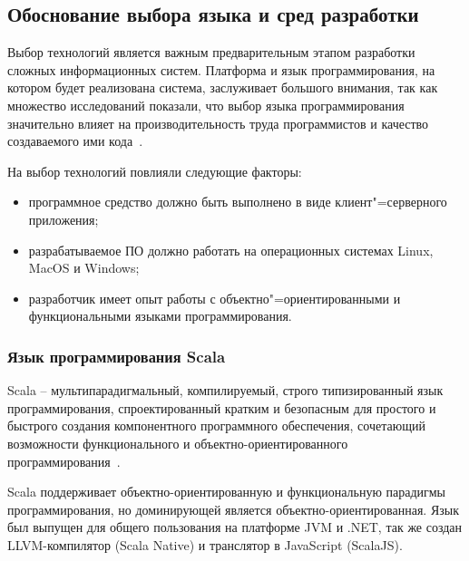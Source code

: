 \subsection{Обоснование выбора языка и сред разработки}
\label{sec:techs:intro}

Выбор технологий является важным предварительным этапом разработки сложных информационных систем. Платформа и язык программирования, на котором будет реализована система, заслуживает большого внимания, так как множество исследований показали, что выбор языка программирования значительно влияет на производительность труда программистов и качество создаваемого ими кода~\cite[c.~59]{mcconnell_2005}.

На выбор технологий повлияли следующие факторы:
\begin{itemize}
\item программное средство должно быть выполнено в виде клиент"=серверного приложения;
\item разрабатываемое ПО должно работать на операционных системах Linux, MacOS и Windows;
\item разработчик имеет опыт работы с объектно"=ориентированными и функциональными языками программирования.
\end{itemize}

\subsubsection{Язык программирования Scala}
\label{sub:techs:scala}
Scala – мультипарадигмальный, компилируемый, строго типизированный язык программирования, спроектированный кратким и безопасным для простого и быстрого создания компонентного программного обеспечения, сочетающий возможности функционального и объектно-ориентированного программирования~\cite{wiki_scala}.

Scala поддерживает объектно-ориентированную и функциональную парадигмы программирования, но доминирующей является объектно-ориентированная. Язык был выпущен для общего пользования на платформе JVM и .NET, так же создан LLVM-компилятор (Scala Native) и транслятор в JavaScript (ScalaJS).

